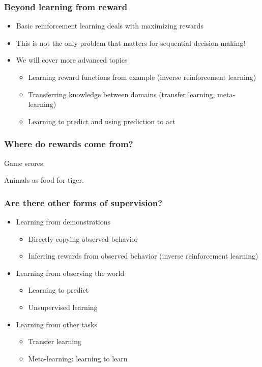 \subsubsection{Beyond learning from reward}
\begin{itemize}
	\item Basic reinforcement learning deals with maximizing rewards
	\item This is not the only problem that matters for sequential decision
	making!
	\item We will cover more advanced topics
		\begin{itemize}
			\item Learning reward functions from example (inverse reinforcement learning)
			\item Transferring knowledge between domains (transfer learning, meta-learning)
			\item Learning to predict and using prediction to act
		\end{itemize}
\end{itemize}

\subsubsection{Where do rewards come from?}
Game scores.

Animals as food for tiger.


\subsubsection{Are there other forms of supervision?}
\begin{itemize}
	\item Learning from demonstrations
		\begin{itemize}
			\item Directly copying observed behavior 
			\item Inferring rewards from observed behavior (inverse reinforcement learning) 
		\end{itemize}
	\item Learning from observing the world
		\begin{itemize}
			\item Learning to predict 
			\item Unsupervised learning 
		\end{itemize}
	\item Learning from other tasks 
		\begin{itemize}
			\item Transfer learning 
			\item Meta-learning: learning to learn
		\end{itemize}
\end{itemize}


